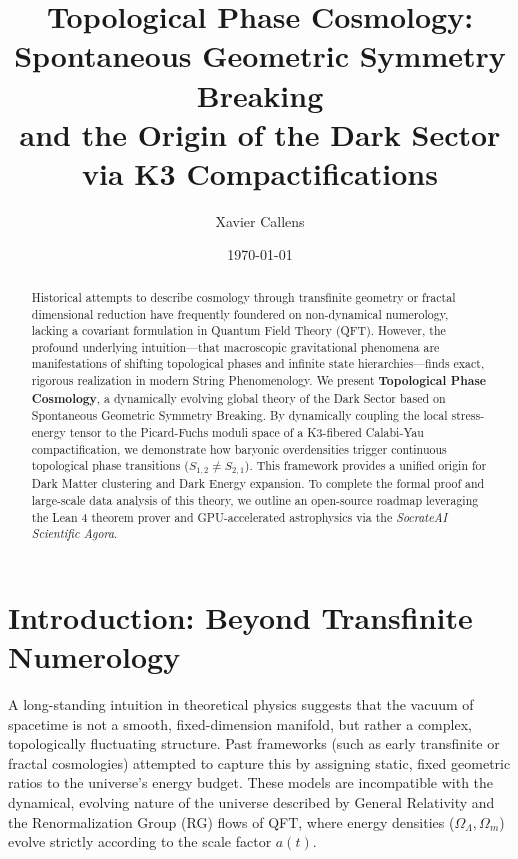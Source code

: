 \documentclass[aps,prd,twocolumn,nofootinbib,superscriptaddress,10pt]{revtex4-2}
\begin{document}
\title{Topological Phase Cosmology: Spontaneous Geometric Symmetry Breaking \\ and the Origin of the Dark Sector via K3 Compactifications}

\author{Xavier Callens}

\date{\today}

\begin{abstract}
Historical attempts to describe cosmology through transfinite geometry or fractal dimensional reduction have frequently foundered on non-dynamical numerology, lacking a covariant formulation in Quantum Field Theory (QFT). However, the profound underlying intuition---that macroscopic gravitational phenomena are manifestations of shifting topological phases and infinite state hierarchies---finds exact, rigorous realization in modern String Phenomenology. We present \textbf{Topological Phase Cosmology}, a dynamically evolving global theory of the Dark Sector based on Spontaneous Geometric Symmetry Breaking. By dynamically coupling the local stress-energy tensor to the Picard-Fuchs moduli space of a K3-fibered Calabi-Yau compactification, we demonstrate how baryonic overdensities trigger continuous topological phase transitions ($S_{1,2} \neq S_{2,1}$). This framework provides a unified origin for Dark Matter clustering and Dark Energy expansion. To complete the formal proof and large-scale data analysis of this theory, we outline an open-source roadmap leveraging the Lean 4 theorem prover and GPU-accelerated astrophysics via the \textit{SocrateAI Scientific Agora}.
\end{abstract}

\maketitle

\section{Introduction: Beyond Transfinite Numerology}

A long-standing intuition in theoretical physics suggests that the vacuum of spacetime is not a smooth, fixed-dimension manifold, but rather a complex, topologically fluctuating structure. Past frameworks (such as early transfinite or fractal cosmologies) attempted to capture this by assigning static, fixed geometric ratios to the universe's energy budget. These models are incompatible with the dynamical, evolving nature of the universe described by General Relativity and the Renormalization Group (RG) flows of QFT, where energy densities ($\Omega_\Lambda, \Omega_m$) evolve strictly according to the scale factor $a(t)$.
\end{document}
